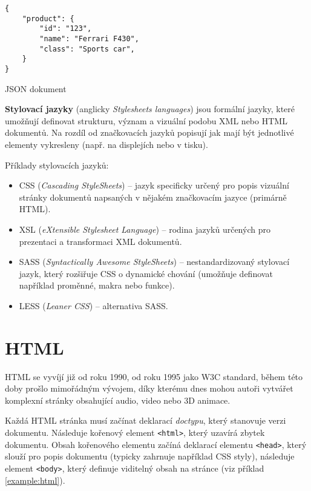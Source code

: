 \begin{example}
    \centering
    \begin{lstlisting}
{
    "product": {
        "id": "123",
        "name": "Ferrari F430",
        "class": "Sports car",
    }
}
    \end{lstlisting}
    \caption{JSON dokument}
    \label{example:json}
\end{example}

\textbf{Stylovací jazyky} (anglicky \textit{Stylesheets languages}) jsou formální jazyky, které umožňují definovat strukturu, význam a vizuální podobu XML nebo HTML dokumentů. Na rozdíl od značkovacích jazyků popisují jak mají být jednotlivé elementy vykresleny (např. na displejích nebo v tisku). \cite{16}

Příklady stylovacích jazyků:

\begin{itemize}
    \item CSS (\textit{Cascading StyleSheets}) -- jazyk specificky určený pro popis vizuální stránky dokumentů napsaných v nějakém značkovacím jazyce (primárně HTML).
    \item XSL (\textit{eXtensible Stylesheet Language}) -- rodina jazyků určených pro prezentaci a transformaci XML dokumentů.
    \item SASS (\textit{Syntactically Awesome StyleSheets}) -- nestandardizovaný stylovací jazyk, který rozšiřuje CSS o dynamické chování (umožňuje definovat například proměnné, makra nebo funkce).
    \item LESS (\textit{Leaner CSS}) -- alternativa SASS.
\end{itemize}

\section{HTML}
\label{sec:html}

HTML se vyvíjí již od roku 1990, od roku 1995 jako W3C standard, během této doby prošlo mimořádným vývojem, díky kterému dnes mohou autoři vytvářet komplexní stránky obsahující audio, video nebo 3D animace.

Každá HTML stránka musí začínat deklarací \textit{doctypu}, který stanovuje verzi dokumentu. Následuje kořenový element \texttt{<html>}, který uzavírá zbytek dokumentu. Obsah kořenového elementu začíná deklarací elementu \texttt{<head>}, který slouží pro popis dokumentu (typicky zahrnuje například CSS styly), následuje element \texttt{<body>}, který definuje viditelný obsah na stránce (viz příklad \ref{example:html}).

